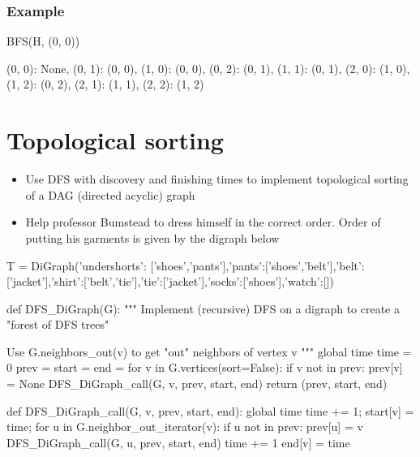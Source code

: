 \subsubsection*{Example}

\begin{sageCell}
    BFS(H, (0, 0))
\end{sageCell}
\begin{outCell}
   {(0, 0): None,
    (0, 1): (0, 0),
    (1, 0): (0, 0),
    (0, 2): (0, 1),
    (1, 1): (0, 1),
    (2, 0): (1, 0),
    (1, 2): (0, 2),
    (2, 1): (1, 1),
    (2, 2): (1, 2)}
\end{outCell}

\section{Topological sorting}

\begin{itemize}
\item Use DFS with discovery and finishing times to implement topological sorting of a DAG (directed acyclic) graph
\item Help professor Bumstead to dress himself in the correct order. Order of putting his garments is given by the digraph below
\end{itemize}

\begin{sageCell}
    T = DiGraph({'undershorts': ['shoes','pants'],'pants':['shoes','belt'],'belt':['jacket'],'shirt':['belt','tie'],'tie':['jacket'],'socks':['shoes'],'watch':[]})
\end{sageCell}

\begin{sageCell}
def DFS_DiGraph(G):
    """
    Implement (recursive) DFS on a digraph to create a
    "forest of DFS trees"

    Use G.neighbors_out(v) to get "out" neighbors of vertex v
    """
    global time
    time = 0
    prev = {}
    start = {}
    end = {}
    for v in G.vertices(sort=False):
        if v not in prev:
            prev[v] = None
            DFS_DiGraph_call(G, v, prev, start, end)
    return (prev, start, end)

def DFS_DiGraph_call(G, v, prev, start, end):
    global time
    time += 1;
    start[v] = time;
    for u in G.neighbor_out_iterator(v):
        if u not in prev:
            prev[u] = v
            DFS_DiGraph_call(G, u, prev, start, end)
    time += 1
    end[v] = time
\end{sageCell}

